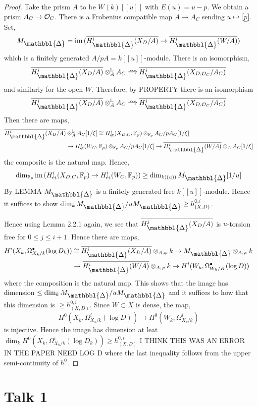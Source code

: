 \documentclass[12pt]{article}
\newcommand{\Prism}{{\mathlarger{\mathbbl{\Delta}}}}
\begin{document}
\begin{proof}
Take the prism $A$ to be $W(k)[[u]]$ with $E(u) = u - p$. We obtain a prism $A_C \to \mathcal{O}_C$. There is a Frobenius compatible map $A \to A_C$ sending $u \mapsto [\underline{p}]$. Set,
\[ M_{\Prism} = \im{(\ol{H^i_{\Prism}(X_D/A)} \to \ol{H^i_{\Prism}(W/A)})} \]
which is a finitely generated $A / pA = k[[u]]$-module. There is an isomorphism,
\[ \ol{H^i_{\Prism}(X_D/A)} \ot_A^{\LL} A_C \iso \ol{H^i_{\Prism}(X_{D, \cO_C}/A_C)} \]
and similarly for the open $W$. Therefore, by {\color{red} PROPERTY} there is an isomorphism
\[ \ol{H^i_{\Prism}(X_D/A)} \ot_A^{\LL} A_C \iso \ol{H^i_{\Prism}(X_{D, \cO_C}/A_C)} \]
Then there are maps,
\begin{align*}
\ol{H^i_{\Prism}(X_D/A)} & \ot_A^{\LL} A_C [1/\xi] \cong H^i_{\et}(X_{D,C}, \FF_p) \ot_{\FF_p} A_C / p A_C [1/\xi]
\\
& \to H^i_{\et}(W_C, \FF_p) \ot_{\FF_p} A_C / p A_C[1/\xi] \to \ol{H^i_{\Prism}(W/A)} \ot_A A_C[1/\xi] 
\end{align*}
the composite is the natural map. Hence,
\[ \dim_{\FF_p} \im{(H^i_{\et}(X_{D,C}, \FF_p) \to H^i_{\et}(W_C, \FF_p))} \ge \dim_{k((u))} M_{\Prism}[1/u] \]
By {\color{red} LEMMA} $M_{\Prism}$ is a finitely generated free $k[[u]]$-module. Hence it suffices to show $\dim_k M_{\Prism} / u M_{\Prism} \ge h^{0,i}_{(X,D)}$. 


Hence using Lemma 2.2.1 again, we see that $\ol{H^j_{\Prism}(X_D/A)}$ is $u$-torsion free for $0 \le j \le i + 1$. Hence there are maps,
\begin{align*}
H^i(X_k, \Omega^\bullet_{X_k/k}(\log{D_k})) & \cong \ol{H^i_{\Prism}(X_D/A)} \ot_{A, \varphi} k \to M_{\Prism} \ot_{A, \varphi} k 
\\
& \to \ol{H^i_{\Prism}(W/A)} \ot_{A, \varphi} k \to H^i(W_k, \Omega^\bullet_{W_k/K}(\log{D})) 
\end{align*}
where the composition is the natural map. This shows that the image has dimension $\le \dim_k M_{\Prism} / u M_{\Prism}$ and it suffices to how that this dimension is $\ge h^{0,i}_{(X,D)}$. Since $W \subset X$ is dense, the map,
\[ H^0(X_k, \Omega^i_{X_k/k}(\log{D})) \to H^0(W_k, \Omega^i_{X_k/k}) \]
is injective. Hence the image has dimension at leat $\dim_k H^0(X_k, \Omega^i_{X_k/k}(\log{D_k})) \ge h^{0,i}_{(X,D)}$ {\color{red} I THINK THIS WAS AN ERROR IN THE PAPER NEED LOG D} where the last inequality follows from the upper semi-continuity of $h^0$. 
\end{proof}

\section{Talk 1}
\end{document}
